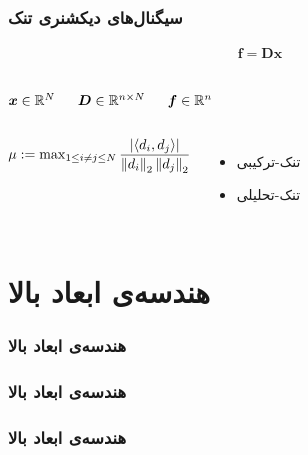 \begin{frame}
\frametitle{سیگنال‌های دیکشنری تنک}
\begin{align}
\label{eq7}
\bm{f} = \bm{D}\bm{x}
\end{align}
\begin{columns}
\begin{center}
$\bm{x}\in \mathbb{R}^{N}$
\end{center}
\begin{center}
$\bm{D}\in \mathbb{R}^{n\times N}$
\end{center}
\begin{center}
$\bm{f}\in \mathbb{R}^{n}$
\end{center}
\end{columns}

\begin{columns}
\begin{block}{}
$\mu := \max_{1\leq i\neq j\leq N} \dfrac{| \langle d_{i},d_{j}\rangle|}{\left\lVert d_{i}\right\rVert_{2}\left\lVert d_{j}\right\rVert_{2}}$
\end{block}
\begin{itemize}
\item{
تنک-ترکیبی
}
\item{
تنک-تحلیلی
}
\end{itemize}
\end{columns}
\end{frame}
\section{هندسه‌ی ابعاد بالا\hfill}
\begin{frame}
\frametitle{هندسه‌ی ابعاد بالا}

\end{frame}
\begin{frame}
\frametitle{هندسه‌ی ابعاد بالا}
\framesubtitle{}

\end{frame}
\begin{frame}
\frametitle{هندسه‌ی ابعاد بالا}
\framesubtitle{}
\end{frame}
